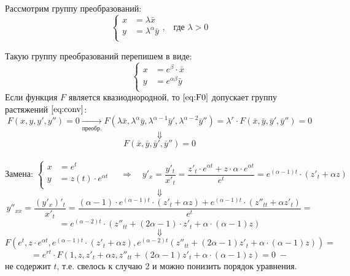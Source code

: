 \begin{corollary}
\begin{enumerate}
			Рассмотрим группу преобразований:
			\begin{equation} \label{eq:conv}
				\left\{
				\begin{aligned} 
				x &= \lambda \bar{x}  \\
				y &= \lambda^{\alpha} \bar{y}\\   
				\end{aligned}
				\right.\text{,}  \quad  \text{где } \lambda > 0                                            
			\end{equation}

			Такую группу преобразований перепишем в виде: 
			\[
				\left\{
				\begin{aligned}
					x &= e^{\beta} \cdot \bar{x}  \\
					y &= e^{\alpha \beta} \bar{y} \\   
				\end{aligned}
				\right.                                                          
			\]
			Если функция $F$ является квазиоднородной, то $\eqref{eq:F0}$ допускает группу растяжений $\eqref{eq:conv}$: \\
			\[
				\boxed{F(x, y, y', y'') = 0} \xrightarrow[\text{преобр.}]{} F(\lambda \bar{x}, \lambda^{\alpha} \bar{y}, \lambda^{\alpha - 1} \bar{y}', \lambda^{\alpha - 2} \bar{y}'') = \lambda^{r} \cdot F(\bar{x}, \bar{y}, \bar{y}', \bar{y}'') = 0
			\]
			\[
				\Downarrow
			\]
			\[
				F(\bar{x}, \bar{y}, \bar{y}', \bar{y}'') = 0
			\]
			\ \\
			\[
			\text{Замена: }\left\{
			\begin{aligned}
				x &= e^{t}  \\
				y &= z(t) \cdot e^{\alpha t}\\   
			\end{aligned}
			\right. \quad
			\Rightarrow  \quad y'_x = \frac{y'_t}{x'_t} = \frac{z'_t \cdot e^{\alpha t} +  z \cdot \alpha \cdot e^{\alpha t}}{e^t} =  e^{(\alpha  -  1)t} \cdot (z'_t  + \alpha z)                                              
			\]
			\[
			\Downarrow
			\]
			\[
				y''_{xx} = \frac{(y'_x)'_t}{x'_t} = \frac{(\alpha - 1) \cdot e^{(\alpha - 1)t} \cdot (z'_t + \alpha z) + e^{(\alpha - 1)t} \cdot (z''_{tt} + \alpha z'_t)}{e^t} = 
			\]	
			\[	
				= e^{(\alpha - 2)t} \cdot (z''_{tt} + (2\alpha - 1)\cdot z'_t + \alpha \cdot (\alpha - 1)z)
			\]
			\[
			\Downarrow
			\]
			\[
				F(e^t, z \cdot e^{\alpha t}, e^{(\alpha - 1)t} \cdot (z'_t + \alpha z), e^{(\alpha - 2)t}(z''_{tt} + (2\alpha - 1)z'_t + \alpha \cdot (\alpha - 1)z) ) =
			\]
			\[
				= e^{rt} \cdot F(1, z, z'_t + \alpha z, z''_{tt} + (2\alpha - 1)z'_t + \alpha \cdot (\alpha - 1)z) = 0 \; -
			\]
			не содержит $t$, т.е. свелось к случаю 2 и можно понизить порядок уравнения.
	\end{enumerate}
\end{corollary}

